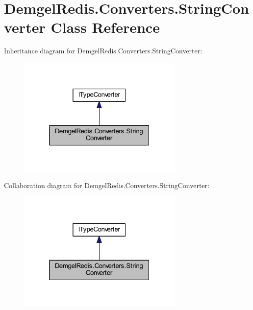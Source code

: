 \hypertarget{class_demgel_redis_1_1_converters_1_1_string_converter}{}\section{Demgel\+Redis.\+Converters.\+String\+Converter Class Reference}
\label{class_demgel_redis_1_1_converters_1_1_string_converter}


Inheritance diagram for Demgel\+Redis.\+Converters.\+String\+Converter\+:
\nopagebreak
\begin{figure}[H]
\begin{center}
\leavevmode
\includegraphics[width=232pt]{class_demgel_redis_1_1_converters_1_1_string_converter__inherit__graph}
\end{center}
\end{figure}


Collaboration diagram for Demgel\+Redis.\+Converters.\+String\+Converter\+:
\nopagebreak
\begin{figure}[H]
\begin{center}
\leavevmode
\includegraphics[width=232pt]{class_demgel_redis_1_1_converters_1_1_string_converter__coll__graph}
\end{center}
\end{figure}
